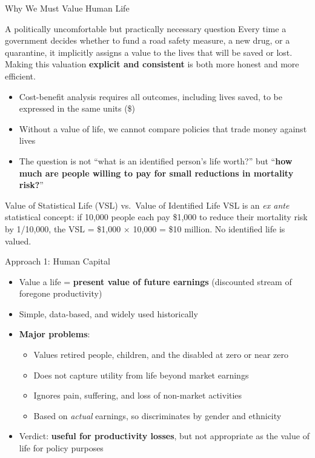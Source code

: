 \documentclass[aspectratio=169, 12pt]{beamer}
\begin{document}
\begin{frame}{Why We Must Value Human Life}
  \begin{block}{A politically uncomfortable but practically necessary question}
    Every time a government decides whether to fund a road safety measure, a new drug, or a
    quarantine, it implicitly assigns a value to the lives that will be saved or lost.
    Making this valuation \textbf{explicit and consistent} is both more honest and more efficient.
  \end{block}
  \vspace{0.3em}
  \begin{itemize}
    \item Cost-benefit analysis requires all outcomes, including lives saved, to be expressed
          in the same units (\$)
    \item Without a value of life, we cannot compare policies that trade money against lives
    \item The question is not ``what is an identified person's life worth?'' but
          ``\textbf{how much are people willing to pay for small reductions in mortality risk?}''
  \end{itemize}
  \begin{alertblock}{Value of Statistical Life (VSL) vs.\ Value of Identified Life}
    VSL is an \emph{ex ante} statistical concept: if 10,000 people each pay \$1,000 to
    reduce their mortality risk by 1/10,000, the VSL = \$1,000 $\times$ 10,000 = \$10 million.
    No identified life is valued.
  \end{alertblock}
\end{frame}

\begin{frame}{Approach 1: Human Capital}
  \begin{itemize}
    \item Value a life = \textbf{present value of future earnings} (discounted stream of
          foregone productivity)
    \item Simple, data-based, and widely used historically
    \item \textbf{Major problems}:
    \begin{itemize}
      \item Values retired people, children, and the disabled at zero or near zero
      \item Does not capture utility from life beyond market earnings
      \item Ignores pain, suffering, and loss of non-market activities
      \item Based on \emph{actual} earnings, so discriminates by gender and ethnicity
    \end{itemize}
    \item Verdict: \textbf{useful for productivity losses}, but not appropriate as the
          value of life for policy purposes
  \end{itemize}
\end{frame}
\end{document}
